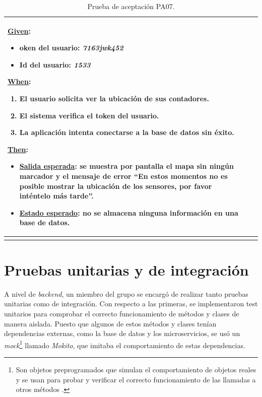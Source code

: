 \documentclass[pdftex,11pt,a4paper]{book}
\begin{document}
\begin{center}
\begin{longtable}{|>{\centering\arraybackslash}X m{2cm}|m{12cm}|}
\underline{Given}:
\vspace{-3mm}
\begin{itemize}
\addtolength{\itemsep}{-3mm}
\item oken del usuario: \textit{7163jwk452}
\item Id del usuario: \textit{1533}

\end{itemize}

\underline{When}:
\begin{enumerate}
\vspace{-3mm}
\addtolength{\itemsep}{-3mm}
\item El usuario solicita ver la ubicación de sus contadores.
\item El sistema verifica el token del usuario.
\item La aplicación intenta conectarse a la base de datos sin éxito.

\end{enumerate}
\break

\underline{Then}:
\vspace{-3mm}
\begin{itemize}
\addtolength{\itemsep}{-3mm}
\item \underline{Salida esperada}: se muestra por pantalla el mapa sin ningún marcador y el mensaje de error “En estos momentos no es posible mostrar la ubicación de los sensores, por favor inténtelo más tarde”.
\item \underline{Estado esperado}: no se almacena ninguna información en una base de datos.
\end{itemize}
\\ \hline

\caption{Prueba de aceptación PA07.} \label{tablalarga:tablaPA07}
\end{longtable}
\end{center}




\section{Pruebas unitarias y de integración} \label{seccion:pruebas-unitarias-integracion}

A nivel de \textit{backend}, un miembro del grupo se encargó de realizar tanto pruebas unitarias como de integración. Con respecto a las primeras, se implementaron test unitarios para comprobar el correcto funcionamiento de métodos y clases de manera aislada. Puesto que algunos de estos métodos y clases tenían dependencias externas, como la base de datos y los microservicios, se usó un \textit{mock}\footnote{Son objetos preprogramados que simulan el comportamiento de objetos reales y se usan para probar y verificar el correcto funcionamiento de las llamadas a otros métodos \cite{bib:mock}.} llamado \textit{Mokito}, que imitaba el comportamiento de estas dependencias. 
\end{document}
